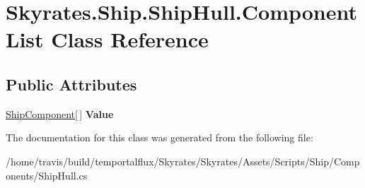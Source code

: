 \hypertarget{class_skyrates_1_1_ship_1_1_ship_hull_1_1_component_list}{\section{Skyrates.\-Ship.\-Ship\-Hull.\-Component\-List Class Reference}
\label{class_skyrates_1_1_ship_1_1_ship_hull_1_1_component_list}
}
\subsection*{Public Attributes}
\begin{DoxyCompactItemize}
\item 
\hypertarget{class_skyrates_1_1_ship_1_1_ship_hull_1_1_component_list_ad683a6bd05a3c4110232cc8d66e3ff05}{\hyperlink{class_skyrates_1_1_ship_1_1_ship_component}{Ship\-Component}\mbox{[}$\,$\mbox{]} {\bfseries Value}}\label{class_skyrates_1_1_ship_1_1_ship_hull_1_1_component_list_ad683a6bd05a3c4110232cc8d66e3ff05}

\end{DoxyCompactItemize}


The documentation for this class was generated from the following file\-:\begin{DoxyCompactItemize}
\item 
/home/travis/build/temportalflux/\-Skyrates/\-Skyrates/\-Assets/\-Scripts/\-Ship/\-Components/Ship\-Hull.\-cs\end{DoxyCompactItemize}
